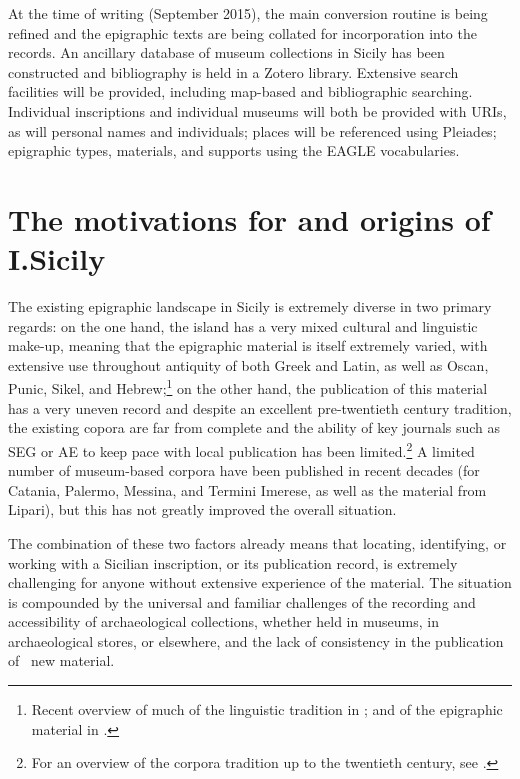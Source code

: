 \documentclass[amsthm,ebook]{saparticle}
\begin{document}
At the time of writing (September 2015), the main conversion routine is being refined and the epigraphic texts are being
collated for incorporation into the records. An ancillary database of museum collections in Sicily has been constructed
and bibliography is held in a Zotero library. Extensive search facilities will be provided, including map-based and
bibliographic searching. Individual inscriptions and individual museums will both be provided with URIs, as will
personal names and individuals; places will be referenced using Pleiades; epigraphic types, materials, and supports
using the EAGLE vocabularies.

\section{The motivations for and origins of I.Sicily}


The existing epigraphic landscape in Sicily is extremely diverse in two primary regards: on the one hand, the island has
a very mixed cultural and linguistic make-up, meaning that the epigraphic material is itself extremely varied, with
extensive use throughout antiquity of both Greek and Latin, as well as Oscan, Punic, Sikel, and Hebrew;\footnote{
Recent overview of much of the linguistic tradition in \citet{tribulato_language_2012}; and of the epigraphic material in \citet{gulletta_sicilia_1999}.} on the other hand, the publication of this material has a very uneven record and despite an excellent
pre-twentieth century tradition, the existing copora are far from complete and the ability of key journals such as SEG
or AE to keep pace with local publication has been limited.\footnote{ For an overview of the corpora tradition up to
the twentieth century, see \citet{de_vido_corpora_1999}.} A limited number of museum-based corpora have been published in recent
decades (for Catania, Palermo, Messina, and Termini Imerese, as well as the material from Lipari), but this has not
greatly improved the overall situation.

The combination of these two factors already means that locating, identifying, or working with a Sicilian inscription,
or its publication record, is extremely challenging for anyone without extensive experience of the material. The
situation is compounded by the universal and familiar challenges of the recording and accessibility of archaeological
collections, whether held in museums, in archaeological stores, or elsewhere, and the lack of consistency in the
publication of \ new material.
\end{document}
